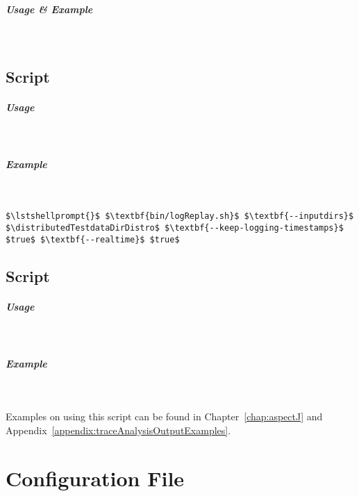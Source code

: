 \paragraph*{Usage \& Example}\

\setTextListing


\section{Script }

\paragraph*{Usage}\

\setTextListing


\paragraph*{Example}\

\setTextListing
\begin{lstlisting}
$\lstshellprompt{}$ $\textbf{bin/logReplay.sh}$ $\textbf{--inputdirs}$ $\distributedTestdataDirDistro$ $\textbf{--keep-logging-timestamps}$ $true$ $\textbf{--realtime}$ $true$
\end{lstlisting}

\section{Script }

\paragraph*{Usage}\

\setTextListing


\paragraph*{Example}\

Examples on using this script can be found in Chapter~\ref{chap:aspectJ} and %
Appendix~\ref{appendix:traceAnalysisOutputExamples}.

\chapter{\KiekerMonitoringPart{} Configuration File}\label{sec:appdx:monitoringproperties}

